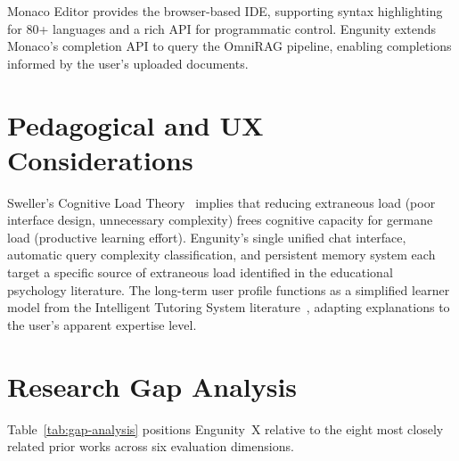 Monaco Editor provides the browser-based IDE, supporting syntax highlighting for 80+ languages and a rich API for programmatic control. Engunity extends Monaco's completion API to query the OmniRAG pipeline, enabling completions informed by the user's uploaded documents.

\section{Pedagogical and UX Considerations}
\label{sec:pedagogy}

Sweller's Cognitive Load Theory~\citep{sweller1988cognitive} implies that reducing extraneous load (poor interface design, unnecessary complexity) frees cognitive capacity for germane load (productive learning effort). Engunity's single unified chat interface, automatic query complexity classification, and persistent memory system each target a specific source of extraneous load identified in the educational psychology literature. The long-term user profile functions as a simplified learner model from the Intelligent Tutoring System literature~\citep{ma2014intelligent}, adapting explanations to the user's apparent expertise level.

\section{Research Gap Analysis}
\label{sec:gap-analysis}

Table~\ref{tab:gap-analysis} positions Engunity~X relative to the eight most closely related prior works across six evaluation dimensions.

